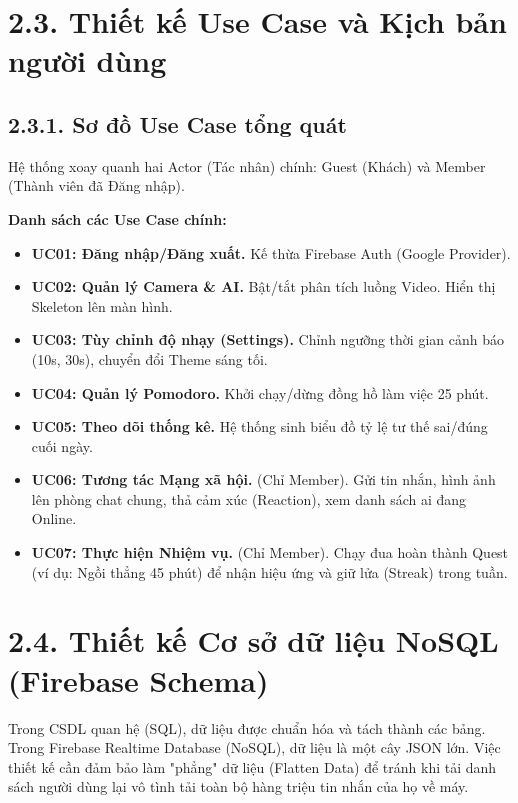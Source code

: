 \documentclass[12pt,a4paper]{report}
\begin{document}
\section{2.3. Thiết kế Use Case và Kịch bản người dùng}

\subsection{2.3.1. Sơ đồ Use Case tổng quát}
Hệ thống xoay quanh hai Actor (Tác nhân) chính: Guest (Khách) và Member (Thành viên đã Đăng nhập).


\textbf{Danh sách các Use Case chính:}
\begin{itemize}
    \item \textbf{UC01: Đăng nhập/Đăng xuất.} Kế thừa Firebase Auth (Google Provider).
    \item \textbf{UC02: Quản lý Camera \& AI.} Bật/tắt phân tích luồng Video. Hiển thị Skeleton lên màn hình.
    \item \textbf{UC03: Tùy chỉnh độ nhạy (Settings).} Chỉnh ngưỡng thời gian cảnh báo (10s, 30s), chuyển đổi Theme sáng tối.
    \item \textbf{UC04: Quản lý Pomodoro.} Khởi chạy/dừng đồng hồ làm việc 25 phút.
    \item \textbf{UC05: Theo dõi thống kê.} Hệ thống sinh biểu đồ tỷ lệ tư thế sai/đúng cuối ngày.
    \item \textbf{UC06: Tương tác Mạng xã hội.} (Chỉ Member). Gửi tin nhắn, hình ảnh lên phòng chat chung, thả cảm xúc (Reaction), xem danh sách ai đang Online.
    \item \textbf{UC07: Thực hiện Nhiệm vụ.} (Chỉ Member). Chạy đua hoàn thành Quest (ví dụ: Ngồi thẳng 45 phút) để nhận hiệu ứng và giữ lửa (Streak) trong tuần.
\end{itemize}

\section{2.4. Thiết kế Cơ sở dữ liệu NoSQL (Firebase Schema)}
Trong CSDL quan hệ (SQL), dữ liệu được chuẩn hóa và tách thành các bảng. Trong Firebase Realtime Database (NoSQL), dữ liệu là một cây JSON lớn. Việc thiết kế cần đảm bảo làm "phẳng" dữ liệu (Flatten Data) để tránh khi tải danh sách người dùng lại vô tình tải toàn bộ hàng triệu tin nhắn của họ về máy.
\end{document}
